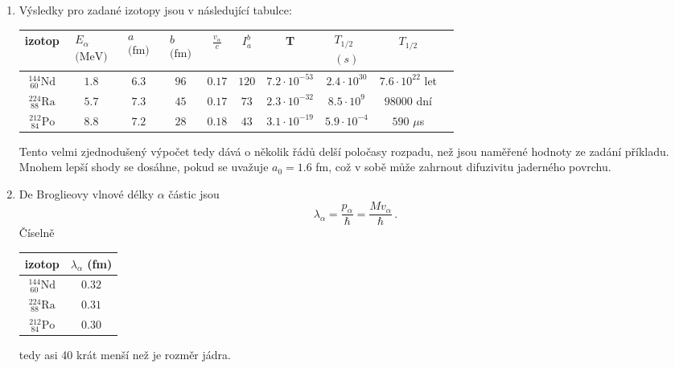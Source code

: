\begin{solution}
\begin{enumerate}
	\item
		Výsledky pro zadané izotopy jsou v následující tabulce:
		\begin{center}
			\begin{tabular}{|c|c|c|c|c|c|c|c|c|c|}
				\hline
				izotop & $\begin{array}{c}E_{\alpha} \\ \text{(MeV)}\end{array}$ & $\begin{array}{c}a \\ \text{(fm)}\end{array}$ & $\begin{array}{c}b \\ \text{(fm)}\end{array}$ 
				& $\frac{v_{\alpha}}{c}$ & $I_{a}^{b}$ & T & $\begin{array}{c}T_{1/2} \\ (s)\end{array}$ & $T_{1/2}$ \\
				\hline
				\hline
				$^{144}_{\ 60}{\text{Nd}}$ & $1.8$ & $6.3$ & $96$ & $0.17$ & $120$ & $7.2\cdot10^{-53}$ & $2.4\cdot10^{30}$ & $7.6\cdot10^{22}$ let \\
				\hline
				$^{224}_{\ 88}{\text{Ra}}$ & $5.7$ & $7.3$ & $45$ & $0.17$ & $73$ & $2.3\cdot10^{-32}$ & $8.5\cdot10^{9}$ & $98000$ dní \\
				\hline
				$^{212}_{\ 84}{\text{Po}}$ & $8.8$ & $7.2$ & $28$ & $0.18$ & $43$ & $3.1\cdot10^{-19}$ & $5.9\cdot10^{-4}$ & $590$ $\mu$s\\
				\hline
			\end{tabular}
		\end{center}
		Tento velmi zjednodušený výpočet tedy dává o několik řádů delší poločasy rozpadu, než jsou naměřené hodnoty ze zadání příkladu.
		Mnohem lepší shody se dosáhne, pokud se uvažuje $a_{0}=1.6$ fm, což v sobě může zahrnout difuzivitu jaderného povrchu.
		
	\item
		De Broglieovy vlnové délky $\alpha$ částic jsou
		\begin{equation}
			\lambda_{\alpha}=\frac{p_{\alpha}}{\hbar}=\frac{Mv_{\alpha}}{\hbar}\,.
		\end{equation}
		Číselně
		\begin{center}
			\begin{tabular}{|c|c|}
				\hline
				izotop & $\lambda_{\alpha}$ (fm) \\
				\hline
				\hline
				$^{144}_{\ 60}{\text{Nd}}$ & $0.32$ \\
				\hline
				$^{224}_{\ 88}{\text{Ra}}$ & $0.31$ \\
				\hline
				$^{212}_{\ 84}{\text{Po}}$ & $0.30$ \\
				\hline
			\end{tabular}
		\end{center}
		tedy asi 40 krát menší než je rozměr jádra.				
	\end{enumerate}


\end{solution}
